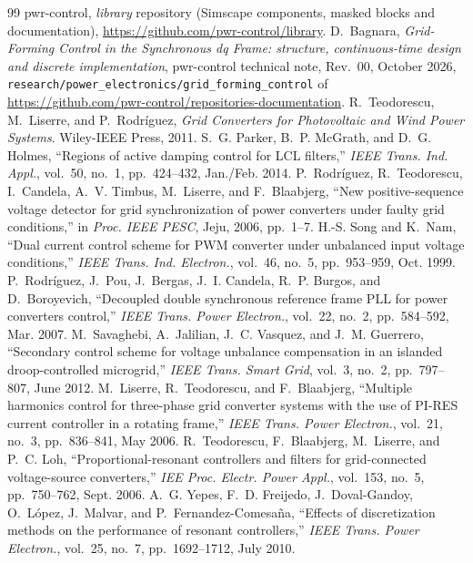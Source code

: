 \documentclass[11pt,a4paper]{scrartcl}
\newcommand{\code}[1]{\texttt{#1}}
\begin{document}
\begin{onehalfspace}
\begin{thebibliography}{99}
	 pwr-control, \textit{library} repository (Simscape components, masked blocks and documentation), \url{https://github.com/pwr-control/library}.
	 D.~Bagnara, \textit{Grid-Forming Control in the Synchronous dq Frame: structure, continuous-time design and discrete implementation}, pwr-control technical note, Rev.~00, October 2026, \code{research/power\_electronics/grid\_forming\_control} of \url{https://github.com/pwr-control/repositories-documentation}.
	 R.~Teodorescu, M.~Liserre, and P.~Rodr\'iguez, \emph{Grid Converters for Photovoltaic and Wind Power Systems}. Wiley-IEEE Press, 2011.
	 S.~G. Parker, B.~P. McGrath, and D.~G. Holmes, ``Regions of active damping control for LCL filters,'' \emph{IEEE Trans. Ind. Appl.}, vol.~50, no.~1, pp.~424--432, Jan./Feb. 2014.
	 P.~Rodr\'iguez, R.~Teodorescu, I.~Candela, A.~V. Timbus, M.~Liserre, and F.~Blaabjerg, ``New positive-sequence voltage detector for grid synchronization of power converters under faulty grid conditions,'' in \emph{Proc. IEEE PESC}, Jeju, 2006, pp.~1--7.
	 H.-S. Song and K.~Nam, ``Dual current control scheme for PWM converter under unbalanced input voltage conditions,'' \emph{IEEE Trans. Ind. Electron.}, vol.~46, no.~5, pp.~953--959, Oct. 1999.
	 P.~Rodr\'iguez, J.~Pou, J.~Bergas, J.~I. Candela, R.~P. Burgos, and D.~Boroyevich, ``Decoupled double synchronous reference frame PLL for power converters control,'' \emph{IEEE Trans. Power Electron.}, vol.~22, no.~2, pp.~584--592, Mar. 2007.
	 M.~Savaghebi, A.~Jalilian, J.~C. Vasquez, and J.~M. Guerrero, ``Secondary control scheme for voltage unbalance compensation in an islanded droop-controlled microgrid,'' \emph{IEEE Trans. Smart Grid}, vol.~3, no.~2, pp.~797--807, June 2012.
	 M.~Liserre, R.~Teodorescu, and F.~Blaabjerg, ``Multiple harmonics control for three-phase grid converter systems with the use of PI-RES current controller in a rotating frame,'' \emph{IEEE Trans. Power Electron.}, vol.~21, no.~3, pp.~836--841, May 2006.
	 R.~Teodorescu, F.~Blaabjerg, M.~Liserre, and P.~C. Loh, ``Proportional-resonant controllers and filters for grid-connected voltage-source converters,'' \emph{IEE Proc. Electr. Power Appl.}, vol.~153, no.~5, pp.~750--762, Sept. 2006.
	 A.~G. Yepes, F.~D. Freijedo, J.~Doval-Gandoy, O.~L\'opez, J.~Malvar, and P.~Fernandez-Comesa\~na, ``Effects of discretization methods on the performance of resonant controllers,'' \emph{IEEE Trans. Power Electron.}, vol.~25, no.~7, pp.~1692--1712, July 2010.
\end{thebibliography}

\end{onehalfspace}
\end{document}

